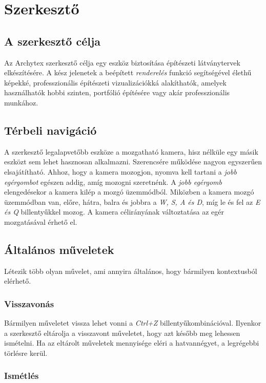 \section{Szerkesztő}

\subsection{A szerkesztő célja}

Az Archytex szerkesztő célja egy eszköz biztosítása építészeti látványtervek elkészítésére. A kész
jelenetek a beépített \emph{renderelés} funkció segítségével élethű képekké, professzionális
építészeti vizualizációkká alakíthatók, amelyek használhatók hobbi szinten, portfólió építésére vagy
akár professzionális munkához.

\subsection{Térbeli navigáció}

A szerkesztő legalapvetőbb eszköze a mozgatható kamera, hisz nélküle egy másik eszközt sem lehet
hasznosan alkalmazni. Szerencsére működése nagyon egyszerűen elsajátítható. Ahhoz, hogy a kamera
mozogjon, nyomva kell tartani a \emph{jobb egérgombot} egészen addig, amíg mozogni szeretnénk.
A \emph{jobb egérgomb} elengedésekor a kamera kilép a mozgó üzemmódból. Miközben a kamera mozgó
üzemmódban van, előre, hátra, balra és jobbra a \emph{W, S, A és D}, míg le és
fel az \emph{E és Q} billentyűkkel mozog. A kamera célirányának változtatása az egér mozgatásával
érhető el.

\subsection{Általános műveletek}

Létezik több olyan művelet, ami annyira általános, hogy bármilyen kontextusból elérhető.

\subsubsection{Visszavonás}

Bármilyen műveletet vissza lehet vonni a \emph{Ctrl+Z} billentyűkombinációval. Ilyenkor a
szerkesztő eltárolja a visszavont műveletet, hogy azt később meg lehessen ismételni. Ha az eltárolt
műveletek mennyisége eléri a hatvannégyet, a legrégebbi törlésre kerül.

\subsubsection{Ismétlés}


